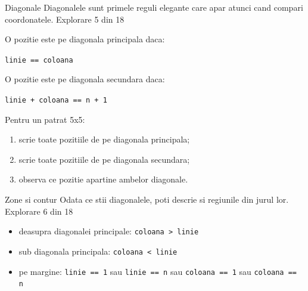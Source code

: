 \clearpage

\PageHeader
  {Diagonale}
  {Diagonalele sunt primele reguli elegante care apar atunci cand compari coordonatele.}
  {Explorare 5 din 18}

\begin{minipage}[t]{0.48\linewidth}
\begin{conceptbox}
O pozitie este pe diagonala principala daca:
\begin{center}
\texttt{linie == coloana}
\end{center}
\end{conceptbox}
\end{minipage}
\hfill
\begin{minipage}[t]{0.48\linewidth}
\begin{conceptbox}
O pozitie este pe diagonala secundara daca:
\begin{center}
\texttt{linie + coloana == n + 1}
\end{center}
\end{conceptbox}
\end{minipage}

\begin{guidebox}[Aplicare]
Pentru un patrat 5x5:
\begin{enumerate}
\item scrie toate pozitiile de pe diagonala principala;
\item scrie toate pozitiile de pe diagonala secundara;
\item observa ce pozitie apartine ambelor diagonale.
\end{enumerate}
\end{guidebox}

\clearpage

\PageHeader
  {Zone si contur}
  {Odata ce stii diagonalele, poti descrie si regiunile din jurul lor.}
  {Explorare 6 din 18}

\begin{conceptbox}
\begin{itemize}
\item deasupra diagonalei principale: \texttt{coloana > linie}
\item sub diagonala principala: \texttt{coloana < linie}
\item pe margine: \texttt{linie == 1} sau \texttt{linie == n} sau \texttt{coloana == 1} sau \texttt{coloana == n}
\end{itemize}
\end{conceptbox}

